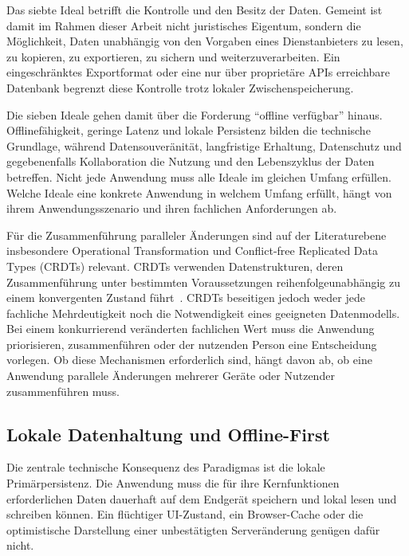 Das siebte Ideal betrifft die Kontrolle und den Besitz der Daten.
Gemeint ist damit im Rahmen dieser Arbeit nicht juristisches Eigentum, sondern die Möglichkeit, Daten unabhängig von den Vorgaben eines Dienstanbieters zu lesen, zu kopieren, zu exportieren, zu sichern und weiterzuverarbeiten.
Ein eingeschränktes Exportformat oder eine nur über proprietäre APIs erreichbare Datenbank begrenzt diese Kontrolle trotz lokaler Zwischenspeicherung.

Die sieben Ideale gehen damit über die Forderung ``offline verfügbar'' hinaus.
Offlinefähigkeit, geringe Latenz und lokale Persistenz bilden die technische Grundlage, während Datensouveränität, langfristige Erhaltung, Datenschutz und gegebenenfalls Kollaboration die Nutzung und den Lebenszyklus der Daten betreffen.
Nicht jede Anwendung muss alle Ideale im gleichen Umfang erfüllen.
Welche Ideale eine konkrete Anwendung in welchem Umfang erfüllt, hängt von ihrem Anwendungsszenario und ihren fachlichen Anforderungen ab.

Für die Zusammenführung paralleler Änderungen sind auf der Literaturebene insbesondere Operational Transformation und Conflict-free Replicated Data Types (CRDTs) relevant.
CRDTs verwenden Datenstrukturen, deren Zusammenführung unter bestimmten Voraussetzungen reihenfolgeunabhängig zu einem konvergenten Zustand führt~\cite{kleppmann2019localfirst}.
CRDTs beseitigen jedoch weder jede fachliche Mehrdeutigkeit noch die Notwendigkeit eines geeigneten Datenmodells.
Bei einem konkurrierend veränderten fachlichen Wert muss die Anwendung priorisieren, zusammenführen oder der nutzenden Person eine Entscheidung vorlegen.
Ob diese Mechanismen erforderlich sind, hängt davon ab, ob eine Anwendung parallele Änderungen mehrerer Geräte oder Nutzender zusammenführen muss.
\subsection{Lokale Datenhaltung und Offline-First}
\label{sec:lokale-datenhaltung}
Die zentrale technische Konsequenz des Paradigmas ist die lokale Primärpersistenz.
Die Anwendung muss die für ihre Kernfunktionen erforderlichen Daten dauerhaft auf dem Endgerät speichern und lokal lesen und schreiben können.
Ein flüchtiger UI-Zustand, ein Browser-Cache oder die optimistische Darstellung einer unbestätigten Serveränderung genügen dafür nicht.

